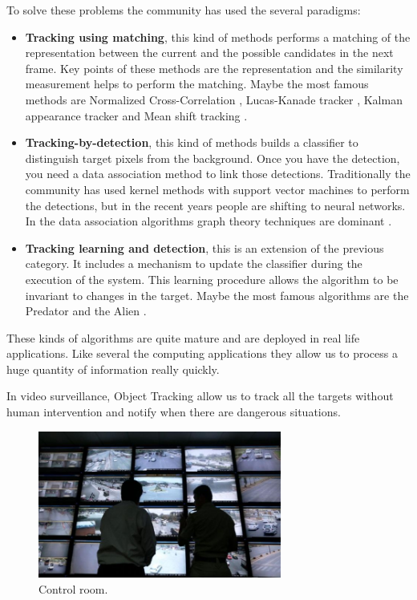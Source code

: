 To solve these problems the community has used the several paradigms:

\begin{itemize}

\item \textbf{Tracking using matching}, this kind of methods performs a matching of the representation between the current and the possible candidates in the next frame. Key points of these methods are the representation and the similarity measurement helps to perform the matching. Maybe the most famous methods are Normalized Cross-Correlation \cite{trackNcc}, Lucas-Kanade tracker \cite{klt}, Kalman appearance tracker \cite{kalmm} and Mean shift tracking  \cite{meanshift}. 

\item \textbf{Tracking-by-detection}, this kind of methods builds a classifier to distinguish target pixels from the background. Once you have the detection, you need a data association method to link those detections. Traditionally the community has used kernel methods with support vector machines \cite{struc} to perform the detections, but in the recent years people are shifting to neural networks. In the data association algorithms graph theory techniques are dominant \cite{dataAsso1} \cite{dataAsso2}.


\item \textbf{Tracking learning and detection}, this is an extension of the previous category. It includes a mechanism to update the classifier during the execution of the system. This learning procedure allows the algorithm to be invariant to changes in the target. Maybe the most famous algorithms are the Predator \cite{tld} and the Alien \cite{alien}.



\end{itemize}


These kinds of algorithms are quite mature and are deployed in real life applications. Like several the computing applications they allow us to process a huge quantity of information really quickly.

In video surveillance, Object Tracking allow us to track all the targets without human intervention and notify when there are dangerous situations. 

\begin{figure}[H]
\centering         
\includegraphics[width=8cm]{aplicaciones/policias.jpg}
\caption{Control room.} \label{introTracking1}
\end{figure}



